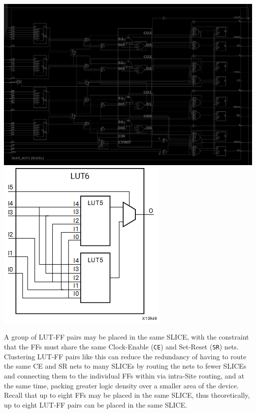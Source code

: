 \begin{multicols}{2}
{    
    \label{fig:intersite_intrasite}
}
{
    \centering
    \includegraphics[width=\columnwidth]{figures/slicel.png}
    \label{fig:slicel}
}
{
    \centering
    \includegraphics[width=0.5\columnwidth]{figures/lut6.png}
    \label{fig:lut6}
}

A group of LUT-FF pairs may be placed in the same SLICE, with the constraint that the FFs must share the same Clock-Enable (\texttt{CE}) and Set-Reset (\texttt{SR}) nets.
Clustering LUT-FF pairs like this can reduce the redundancy of having to route the same CE and SR nets to many SLICEs by routing the nets to fewer SLICEs and connecting them to the individual FFs within via intra-Site routing, and at the same time, packing greater logic density over a smaller area of the device. 
Recall that up to eight FFs may be placed in the same SLICE, thus theoretically, up to eight LUT-FF pairs can be placed in the same SLICE. 


\end{multicols}
